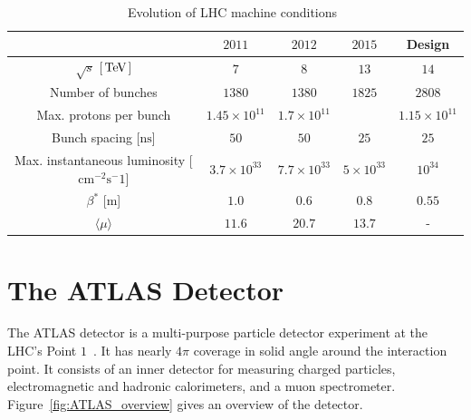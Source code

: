 \begin{table}[h!]
\centering
\captionsetup{justification=centering}

\hspace{-10pt}
\begin{tabular}{|c|c|c|c|c|}
\hline
& $2011$ & $2012$ & $2015$ & Design\\ \hline
$\sqrt{s}$ [$\TeV$] & $7$ & $8$ & $13$ & $14$ \\ \hline
Number of bunches & $1380$ & $1380$ & $1825$ & $2808$ \\ \hline
Max. protons per bunch & $1.45\times10^{11}$ & $1.7\times10^{11}$ & & $1.15 \times 10^{11}$ \\ \hline
Bunch spacing [$\textrm{ns}$] & $50$ & $50$ & $25$ & $25$ \\ \hline
\specialcell{Max. instantaneous \\ luminosity [$\textrm{cm}^{-2} \textrm{s}^-1$]} & $3.7\times 10^{33}$ & $7.7\times10^{33}$ & $5\times10^{33}$ & $10^{34}$\\ \hline
$\beta^*$ [$\textrm{m}$] & $1.0$ & $0.6$ & $0.8$ & $0.55$ \\ \hline 
$\langle \mu \rangle$ & $11.6$ & $20.7$ & $13.7$ & - \\ \hline
\end{tabular}

\caption{
Evolution of LHC machine conditions~\cite{LHC_2011_2012,LHC_2015}
}
\label{tab:LHC_cond}
\end{table}


\section{The ATLAS Detector}

The ATLAS detector is a multi-purpose particle detector experiment at the LHC's Point $1$~\cite{ATLASPaper}. It has nearly $4\pi$ coverage in solid angle around the interaction point. It consists of an inner detector for measuring charged particles, electromagnetic and hadronic calorimeters, and a muon spectrometer. Figure~\ref{fig:ATLAS_overview} gives an overview of the detector.

